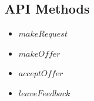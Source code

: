 \documentclass[a4wide, 11pt]{article}
\begin{document}
\subsection{API Methods} 
\begin{itemize}
  \item $makeRequest$
  \item $makeOffer$
  \item $acceptOffer$
  \item $leaveFeedback$
\end{itemize}
\end{document}
